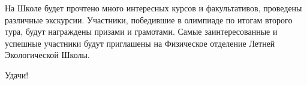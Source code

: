 \documentclass[a4paper,12pt]{article}
\begin{document}
\bigskip

На Школе будет прочтено много интересных курсов и факультативов, проведены различные экскурсии.
Участники, победившие в олимпиаде по итогам второго тура, будут награждены призами и грамотами.
Самые заинтересованные и успешные участники будут приглашены на Физическое отделение Летней Экологической Школы.

\bigskip

Удачи!
\end{document}
